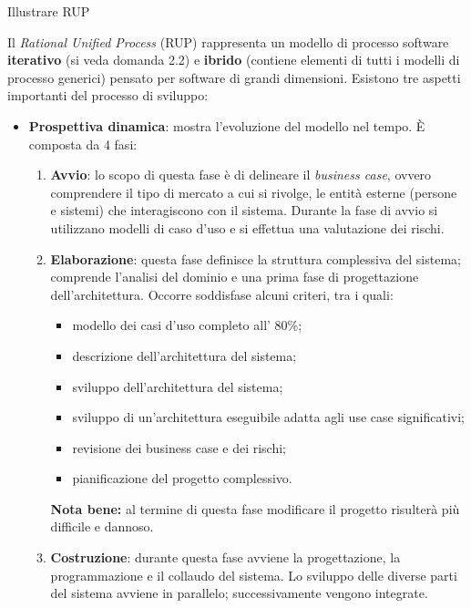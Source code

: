 \begin{problem}{2.3}
Illustrare RUP
\end{problem}
\begin{solution}
Il \textit{Rational Unified Process} (RUP) rappresenta un modello di processo software \textbf{iterativo} (si veda domanda 2.2) e \textbf{ibrido} (contiene elementi di tutti i modelli di processo generici) pensato per software di grandi dimensioni.
\newline
Esistono tre aspetti importanti del processo di sviluppo:
\begin{itemize}
	\item \textbf{Prospettiva dinamica}: mostra l'evoluzione del modello nel tempo. È composta da 4 fasi:
	\begin{enumerate}
		\item \textbf{Avvio}: lo scopo di questa fase è di delineare il \textit{business case}, ovvero comprendere il tipo di mercato a cui si rivolge, le entità esterne (persone e sistemi) che interagiscono con il sistema.
		\newline
		Durante la fase di avvio si utilizzano modelli di caso d'uso e si effettua una valutazione dei rischi.
		\item \textbf{Elaborazione}: questa fase definisce la struttura complessiva del sistema; comprende l'analisi del dominio e una prima fase di progettazione dell'architettura.
		\newline
		Occorre soddisfase alcuni criteri, tra i quali:
		\begin{itemize}
			\item modello dei casi d'uso completo all' 80\%;
			\item descrizione dell'architettura del sistema;
			\item sviluppo dell'architettura del sistema;
			\item sviluppo di un'architettura eseguibile adatta agli use case significativi;
			\item revisione dei business case e dei rischi;
			\item pianificazione del progetto complessivo.
		\end{itemize}
		\textbf{Nota bene:} al termine di questa fase modificare il progetto risulterà più difficile e dannoso.
		\item \textbf{Costruzione}: durante questa fase avviene la progettazione, la programmazione e il collaudo del sistema.
		Lo sviluppo delle diverse parti del sistema avviene in parallelo; successivamente vengono integrate.
		\newline

\end{enumerate}
\end{itemize}
\end{solution}
